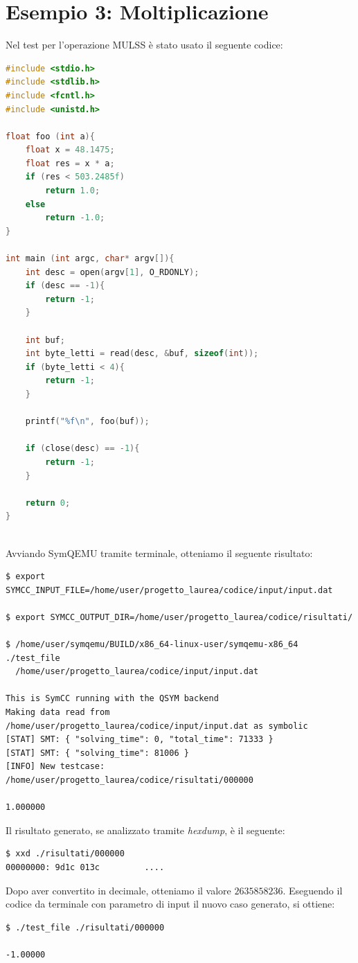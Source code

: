 \documentclass[Lau, oneside]{sapthesis}%
\begin{document}
\newpage
\section{Esempio 3: Moltiplicazione}
Nel test per l'operazione MULSS è stato usato il seguente codice:
\newline
\begin{lstlisting}[xleftmargin=0\textwidth, language=C, basicstyle=\small]
#include <stdio.h>
#include <stdlib.h>
#include <fcntl.h>
#include <unistd.h>

float foo (int a){
    float x = 48.1475;
    float res = x * a;
    if (res < 503.2485f)
        return 1.0;
    else 
        return -1.0;
}

int main (int argc, char* argv[]){
    int desc = open(argv[1], O_RDONLY);
    if (desc == -1){
        return -1;
    }

    int buf;
    int byte_letti = read(desc, &buf, sizeof(int));
    if (byte_letti < 4){
        return -1;
    }

    printf("%f\n", foo(buf));

    if (close(desc) == -1){
        return -1;
    }

    return 0;
}
\end{lstlisting}
\ \\ \newline
Avviando SymQEMU tramite terminale, otteniamo il seguente risultato:
\begin{lstlisting}[xleftmargin=0\textwidth, basicstyle=\footnotesize]
$ export SYMCC_INPUT_FILE=/home/user/progetto_laurea/codice/input/input.dat

$ export SYMCC_OUTPUT_DIR=/home/user/progetto_laurea/codice/risultati/

$ /home/user/symqemu/BUILD/x86_64-linux-user/symqemu-x86_64  ./test_file 
  /home/user/progetto_laurea/codice/input/input.dat

This is SymCC running with the QSYM backend
Making data read from /home/user/progetto_laurea/codice/input/input.dat as symbolic
[STAT] SMT: { "solving_time": 0, "total_time": 71333 }
[STAT] SMT: { "solving_time": 81006 }
[INFO] New testcase: /home/user/progetto_laurea/codice/risultati/000000

1.000000
\end{lstlisting}


\newpage
Il risultato generato, se analizzato tramite \textit{hexdump}, è il seguente:
\begin{lstlisting}[xleftmargin=0\textwidth, language=bash]
$ xxd ./risultati/000000
00000000: 9d1c 013c         ....
\end{lstlisting}
Dopo aver convertito in decimale, otteniamo il valore $2635858236$.
\newline \newline
Eseguendo il codice da terminale con parametro di input il nuovo caso generato, si ottiene:
\begin{lstlisting}[xleftmargin=0\textwidth, language=bash]
$ ./test_file ./risultati/000000

-1.00000
\end{lstlisting}
\end{document}
